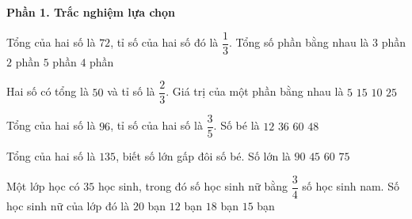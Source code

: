 \textbf{Phần 1. Trắc nghiệm lựa chọn}

\begin{ex} %
Tổng của hai số là $72$, tỉ số của hai số đó là $\dfrac{1}{3}$. Tổng số phần bằng nhau là
\choice
{$3$ phần}
{$2$ phần}
{$5$ phần}
{\True $4$ phần}
\end{ex}

\begin{ex} %
Hai số có tổng là $50$ và tỉ số là $\dfrac{2}{3}$. Giá trị của một phần bằng nhau là
\choice
{$5$}
{$15$}
{\True $10$}
{$25$}
\end{ex}

\begin{ex} %
Tổng của hai số là $96$, tỉ số của hai số là $\dfrac{3}{5}$. Số bé là
\choice
{$12$}
{\True $36$}
{$60$}
{$48$}
\end{ex}

\begin{ex} %
Tổng của hai số là $135$, biết số lớn gấp đôi số bé. Số lớn là
\choice
{\True $90$}
{$45$}
{$60$}
{$75$}
\end{ex}

\begin{ex} %
Một lớp học có $35$ học sinh, trong đó số học sinh nữ bằng $\dfrac{3}{4}$ số học sinh nam. Số học sinh nữ của lớp đó là
\choice
{$20$ bạn}
{$12$ bạn}
{$18$ bạn}
{\True $15$ bạn}
\end{ex}

